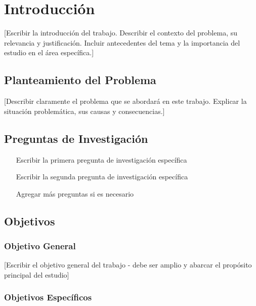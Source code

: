 \documentclass[12pt, letterpaper]{article}
\begin{document}
\newpage
\setcounter{page}{2}

\section{Introducción}

 [Escribir la introducción del trabajo. Describir el contexto del problema, su relevancia y justificación. Incluir antecedentes del tema y la importancia del estudio en el área específica.]

\subsection{Planteamiento del Problema}

[Describir claramente el problema que se abordará en este trabajo. Explicar la situación problemática, sus causas y consecuencias.]

\subsection{Preguntas de Investigación}

\begin{enumerate}
    \item [Escribir la primera pregunta de investigación específica]
    \item [Escribir la segunda pregunta de investigación específica]
    \item [Agregar más preguntas si es necesario]
\end{enumerate}

\subsection{Objetivos}

\subsubsection{Objetivo General}

[Escribir el objetivo general del trabajo - debe ser amplio y abarcar el propósito principal del estudio]

\subsubsection{Objetivos Específicos}
\end{document}
